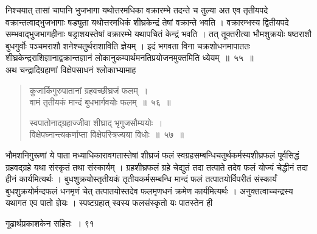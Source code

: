 \documentclass[11pt, openany]{book}
\begin{document}
\begin{sloppypar}
\noindent निश्चयात् तासां चापानि भुजभागा यथोत्तरमधिका वक्रारम्भे तदन्ते च तुल्या अत एव तृतीयपदे वक्रान्तत्वाद्भुजभागाः षड्युता यथोत्तरमधिकं शीघ्रकेन्द्रं तेषां वक्रान्ते भवति । वक्रारम्भस्य द्वितीयपदे सम्भवाद्भुजभागहीनाः षड्राशयस्तेषां वक्रारम्भे यथापचितं केन्द्रं भवति । तत् तूक्तरीत्या भौमशुक्रयोः षष्ठराशौ बुधगुर्वोः पञ्चमराशौ शनेश्चतुर्थराशाविति ज्ञेयम् । इदं भगवता विना चक्रशोधनमापाततः शीघ्रकेन्द्रराशिज्ञानाद्वक्रान्तज्ञानं लोकानुकम्पार्थमनतिप्रयोजनमुक्तमिति ध्येयम्~॥~५५~॥\\
\noindent अथ चन्द्रादिग्रहाणां विक्षेपसाधनं श्लोकाभ्यामाह\textendash
\end{sloppypar}
\begin{quote}

{\ssi कुजार्किगुरुपातानां ग्रहवच्छीघ्रजं फलम्~।\\
वामं तृतीयकं मान्दं बुधभार्गवयोः फलम्~॥~५६~॥

स्वपातोनाद्ग्रहाज्जीवा शीघ्राद् भृगुजसौम्ययोः~।\\
विक्षेपघ्नान्त्यकर्णाप्ता विक्षेपस्त्रिज्यया विधोः~॥~५७~॥}
\end{quote}
\begin{sloppypar}
भौमशनिगुरूणां ये पाता मध्याधिकारावगतास्तेषां शीघ्रजं फलं स्वग्रहसम्बन्धिचतुर्थकर्मस्यशीघ्रफलं पूर्वसिद्धं ग्रहवद्ग्रहे यथा संस्कृतं तथा संस्कार्यम् । ग्रहशीघ्रफलं ग्रहे चेद्युतं तदा तत्पाते तदेव फलं योज्यं चेद्धीनं तदा हीनं कार्यमित्यर्थः । बुधशुक्रयोस्तृतीयकं तृतीयकर्मसम्बन्धि मान्दं फलं तत्पातयोर्विपरीतं संस्कार्यं बुधशुक्रयोर्मन्दफलं धनमृणं चेत् तत्पातयोस्तदेव फलमृणधनं क्रमेण कार्यमित्यर्थः । अनुक्तत्वाच्चन्द्रस्य यथागत एव पातो ज्ञेयः । स्पष्टग्रहात् स्वस्य फलसंस्कृतो यः पातस्तेन ही\textendash
\end{sloppypar}


\newpage


\hspace{3cm} गूढार्थप्रकाशकेन सहितः~। \hfill ९१
\vspace{1cm}
\end{document}
